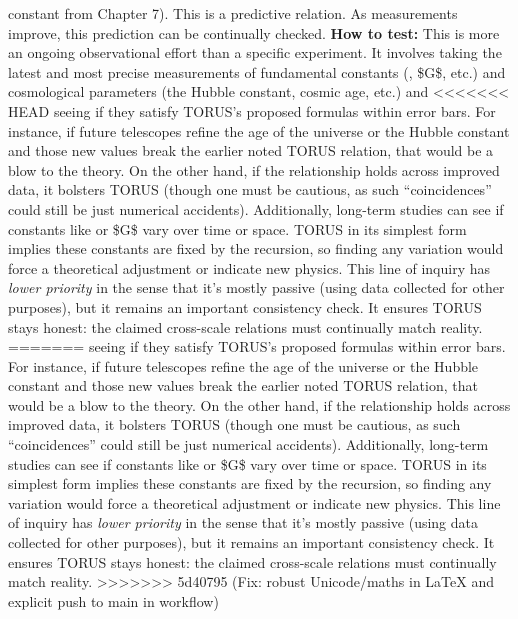 \documentclass[]{article}
\begin{document}
\begin{itemize}
  constant \alpha from Chapter 7). This is a predictive relation. As
  measurements improve, this prediction can be continually checked.
  \textbf{How to test:} This is more an ongoing observational effort
  than a specific experiment. It involves taking the latest and most
  precise measurements of fundamental constants (\alpha, \$G\$, etc.) and
  cosmological parameters (the Hubble constant, cosmic age, etc.) and
<<<<<<< HEAD
  seeing if they satisfy TORUS's proposed formulas within error
  bars\hspace{0pt}. For instance, if future telescopes refine the age of
  the universe or the Hubble constant and those new values break the
  earlier noted TORUS relation, that would be a blow to the theory. On
  the other hand, if the relationship holds across improved data, it
  bolsters TORUS (though one must be cautious, as such ``coincidences''
  could still be just numerical accidents). Additionally, long-term
  studies can see if constants like \alpha or \$G\$ vary over time or space.
  TORUS in its simplest form implies these constants are fixed by the
  recursion, so finding any variation would force a theoretical
  adjustment or indicate new physics. This line of inquiry has
  \emph{lower priority} in the sense that it's mostly passive (using
  data collected for other purposes)\hspace{0pt}, but it remains an
  important consistency check. It ensures TORUS stays honest: the
  claimed cross-scale relations must continually match reality.
=======
  seeing if they satisfy TORUS's proposed formulas within error bars​.
  For instance, if future telescopes refine the age of the universe or
  the Hubble constant and those new values break the earlier noted TORUS
  relation, that would be a blow to the theory. On the other hand, if
  the relationship holds across improved data, it bolsters TORUS (though
  one must be cautious, as such ``coincidences'' could still be just
  numerical accidents). Additionally, long-term studies can see if
  constants like \alpha or \$G\$ vary over time or space. TORUS in its
  simplest form implies these constants are fixed by the recursion, so
  finding any variation would force a theoretical adjustment or indicate
  new physics. This line of inquiry has \emph{lower priority} in the
  sense that it's mostly passive (using data collected for other
  purposes)​, but it remains an important consistency check. It ensures
  TORUS stays honest: the claimed cross-scale relations must continually
  match reality.
>>>>>>> 5d40795 (Fix: robust Unicode/maths in LaTeX and explicit push to main in workflow)
\end{itemize}
\end{document}
